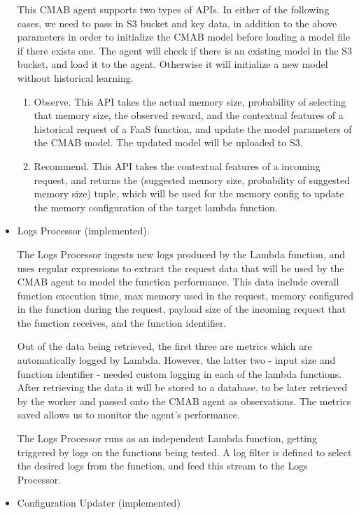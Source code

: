 \documentclass[conference]{IEEEtran}
\begin{document}
\begin{itemize}
This CMAB agent supports two types of APIs. In either of the following cases, we need to pass in S3 bucket and key data, in addition to the above parameters in order to initialize the CMAB model before loading a model file if there exists one. The agent will check if there is an existing model in the S3 bucket, and load it to the agent. Otherwise it will initialize a new model without historical learning.
\begin{enumerate}
    \item Observe. This API takes the actual memory size, probability of selecting that memory size, the observed reward, and the contextual features of a historical request of a FaaS function, and update the model parameters of the CMAB model. The updated model will be uploaded to S3.
    \item Recommend. This API takes the contextual features of a incoming request, and returns the (suggested memory size, probability of suggested memory size) tuple, which will be used for the memory config to update the memory configuration of the target lambda function.
\end{enumerate}

\item Logs Processor (implemented).

The Logs Processor ingests new logs produced by the Lambda function, and uses regular expressions to extract the request data that will be used by the CMAB agent to model the function performance. This data include overall function execution time, max memory used in the request, memory configured in the function during the request, payload size of the incoming request that the function receives, and the function identifier.

Out of the data being retrieved, the first three are metrics which are automatically logged by Lambda. However, the latter two - input size and function identifier - needed custom logging in each of the lambda functions. After retrieving the data it will be stored to a database, to be later retrieved by the worker and passed onto the CMAB agent as observations. The metrics saved allows us to monitor the agent's performance.

The Logs Processor runs as an independent Lambda function, getting triggered by logs on the functions being tested. A log filter is defined to select the desired logs from the function, and feed this stream to the Logs Processor.

\item Configuration Updater (implemented)


\end{itemize}
\end{document}
